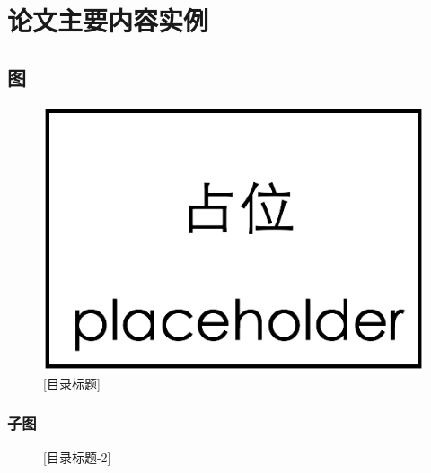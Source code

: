
\chapter{论文主要内容实例}



\section{图}

\begin{figure}[!htbp]
	\centering
	\includegraphics[width=0.5\linewidth]{figure/placeholder}
	[目录标题]
	\label{fig:placeholder}
\end{figure}

\subsection{子图}

\begin{figure}[!htbp]
	\centering
		\vspace{0.5cm}
	[目录标题-2]
	\label{fig:subfigure}
\end{figure}


